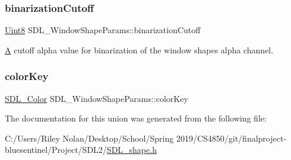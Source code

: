 \subsubsection{\texorpdfstring{binarizationCutoff}{binarizationCutoff}}
{\footnotesize\ttfamily \mbox{\hyperlink{_s_d_l__stdinc_8h_a2944638813a090aa23e62f4da842c3e2}{Uint8}} S\+D\+L\+\_\+\+Window\+Shape\+Params\+::binarization\+Cutoff}



\mbox{\hyperlink{struct_a}{A}} cutoff alpha value for binarization of the window shape\textquotesingle{}s alpha channel. 

\mbox{\label{union_s_d_l___window_shape_params_a8bf3e442a51a1bbf452cfec7c1ed5318}} 
\subsubsection{\texorpdfstring{colorKey}{colorKey}}
{\footnotesize\ttfamily \mbox{\hyperlink{struct_s_d_l___color}{S\+D\+L\+\_\+\+Color}} S\+D\+L\+\_\+\+Window\+Shape\+Params\+::color\+Key}



The documentation for this union was generated from the following file\+:\begin{DoxyCompactItemize}
\item 
C\+:/\+Users/\+Riley Nolan/\+Desktop/\+School/\+Spring 2019/\+C\+S4850/git/finalproject-\/bluesentinel/\+Project/\+S\+D\+L2/\mbox{\hyperlink{_s_d_l__shape_8h}{S\+D\+L\+\_\+shape.\+h}}\end{DoxyCompactItemize}
